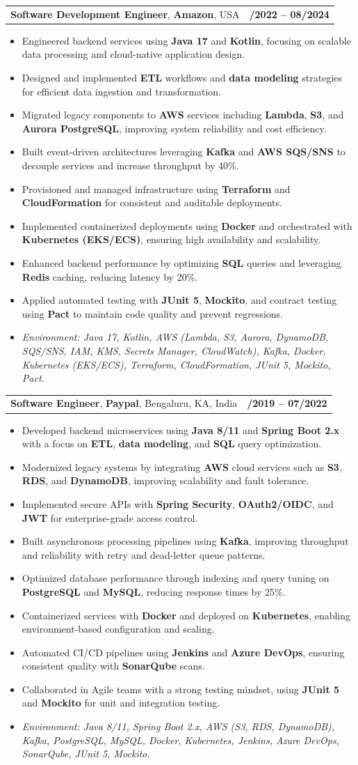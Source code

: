 \documentclass[letterpaper,11pt]{article}
\makeatletter
\newcommand{\resumeItem}[1]{
  \item\footnotesize{
    {#1 \vspace{-2pt}}
  }
}
\newcommand{\resumeSubheading}[4]{
  \vspace{-2pt}\item
    \begin{tabular*}{1.0\textwidth}[t]{l@{\extracolsep{\fill}}r}
      \textbf{\fontsize{10pt}{14pt}\selectfont #3}, \textbf{\fontsize{10pt}{14pt}\selectfont #1}, \fontsize{10pt}{14pt}\selectfont #4 & \textbf{\fontsize{10pt}{14pt}\selectfont #2} \\
    \end{tabular*}\vspace{-7pt}
}
\newcommand{\resumeItemListStart}{\begin{itemize}[leftmargin=*]}
\newcommand{\resumeItemListEnd}{\end{itemize}\vspace{-5pt}}
\makeatother
\begin{document}
\resumeSubheading
{Amazon}{10/2022 -- 08/2024}
{Software Development Engineer}{USA}
\resumeItemListStart
  \resumeItem{Engineered backend services using \textbf{Java 17} and \textbf{Kotlin}, focusing on scalable data processing and cloud-native application design.}
  \resumeItem{Designed and implemented \textbf{ETL} workflows and \textbf{data modeling} strategies for efficient data ingestion and transformation.}
  \resumeItem{Migrated legacy components to \textbf{AWS} services including \textbf{Lambda}, \textbf{S3}, and \textbf{Aurora PostgreSQL}, improving system reliability and cost efficiency.}
  \resumeItem{Built event-driven architectures leveraging \textbf{Kafka} and \textbf{AWS SQS/SNS} to decouple services and increase throughput by 40\%.}
  \resumeItem{Provisioned and managed infrastructure using \textbf{Terraform} and \textbf{CloudFormation} for consistent and auditable deployments.}
  \resumeItem{Implemented containerized deployments using \textbf{Docker} and orchestrated with \textbf{Kubernetes (EKS/ECS)}, ensuring high availability and scalability.}
  \resumeItem{Enhanced backend performance by optimizing \textbf{SQL} queries and leveraging \textbf{Redis} caching, reducing latency by 20\%.}
  \resumeItem{Applied automated testing with \textbf{JUnit 5}, \textbf{Mockito}, and contract testing using \textbf{Pact} to maintain code quality and prevent regressions.}
  \resumeItem{\textit{Environment: Java 17, Kotlin, AWS (Lambda, S3, Aurora, DynamoDB, SQS/SNS, IAM, KMS, Secrets Manager, CloudWatch), Kafka, Docker, Kubernetes (EKS/ECS), Terraform, CloudFormation, JUnit 5, Mockito, Pact.}}
\resumeItemListEnd

\resumeSubheading
{Paypal}{08/2019 -- 07/2022}
{Software Engineer}{Bengaluru, KA, India}
\resumeItemListStart
  \resumeItem{Developed backend microservices using \textbf{Java 8/11} and \textbf{Spring Boot 2.x} with a focus on \textbf{ETL}, \textbf{data modeling}, and \textbf{SQL} query optimization.}
  \resumeItem{Modernized legacy systems by integrating \textbf{AWS} cloud services such as \textbf{S3}, \textbf{RDS}, and \textbf{DynamoDB}, improving scalability and fault tolerance.}
  \resumeItem{Implemented secure APIs with \textbf{Spring Security}, \textbf{OAuth2/OIDC}, and \textbf{JWT} for enterprise-grade access control.}
  \resumeItem{Built asynchronous processing pipelines using \textbf{Kafka}, improving throughput and reliability with retry and dead-letter queue patterns.}
  \resumeItem{Optimized database performance through indexing and query tuning on \textbf{PostgreSQL} and \textbf{MySQL}, reducing response times by 25\%.}
  \resumeItem{Containerized services with \textbf{Docker} and deployed on \textbf{Kubernetes}, enabling environment-based configuration and scaling.}
  \resumeItem{Automated CI/CD pipelines using \textbf{Jenkins} and \textbf{Azure DevOps}, ensuring consistent quality with \textbf{SonarQube} scans.}
  \resumeItem{Collaborated in Agile teams with a strong testing mindset, using \textbf{JUnit 5} and \textbf{Mockito} for unit and integration testing.}
  \resumeItem{\textit{Environment: Java 8/11, Spring Boot 2.x, AWS (S3, RDS, DynamoDB), Kafka, PostgreSQL, MySQL, Docker, Kubernetes, Jenkins, Azure DevOps, SonarQube, JUnit 5, Mockito.}}
\resumeItemListEnd
\end{document}
